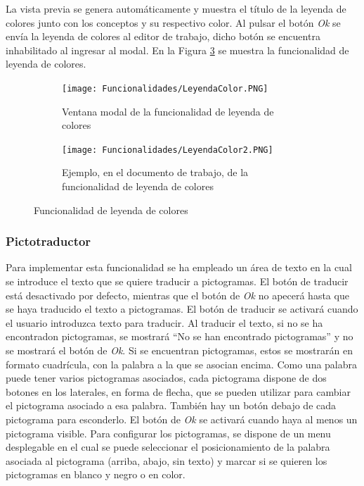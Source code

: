 La vista previa se genera automáticamente y muestra el título de la leyenda de colores junto con los conceptos y su respectivo color. Al pulsar el botón \textit{Ok} se envía la leyenda de colores al editor de trabajo, dicho botón se encuentra inhabilitado al ingresar al modal. En la Figura \ref{fig:leyendacolor} se muestra la funcionalidad de leyenda de colores.

\begin{figure}[ht!]
  \centering
  \begin{subfigure}{\textwidth}
    \centering
    \texttt{[image: Funcionalidades/LeyendaColor.PNG]}
    \caption{Ventana modal de la funcionalidad de leyenda de colores}
    \label{fig:leyendacolor01}
  \end{subfigure}

  \begin{subfigure}{\textwidth}
    \centering
    \texttt{[image: Funcionalidades/LeyendaColor2.PNG]}
    \caption{Ejemplo, en el documento de trabajo, de la funcionalidad de leyenda de colores}
    \label{fig:leyendacolor02}
  \end{subfigure}

  \caption{Funcionalidad de leyenda de colores}
  \label{fig:leyendacolor}
\end{figure}

\subsubsection{Pictotraductor}
\label{sec:imppictotraductor}
Para implementar esta funcionalidad se ha empleado un área de texto en la cual se introduce el texto que se quiere traducir a pictogramas. El botón de traducir está desactivado por defecto, mientras que el botón de \textit{Ok} no apecerá hasta que se haya traducido el texto a pictogramas. El botón de traducir se activará cuando el usuario introduzca texto para traducir. Al traducir el texto, si no se ha encontradon pictogramas, se mostrará ``No se han encontrado pictogramas'' y no se mostrará el botón de \textit{Ok}. Si se encuentran pictogramas, estos se mostrarán en formato cuadrícula, con la palabra a la que se asocian encima. Como una palabra puede tener varios pictogramas asociados, cada pictograma dispone de dos botones en los laterales, en forma de flecha, que se pueden utilizar para cambiar el pictograma asociado a esa palabra. También hay un botón debajo de cada pictograma para esconderlo. El botón de \textit{Ok} se activará cuando haya al menos un pictograma visible. Para configurar los pictogramas, se dispone de un menu desplegable en el cual se puede seleccionar el posicionamiento de la palabra asociada al pictograma (arriba, abajo, sin texto) y marcar si se quieren los pictogramas en blanco y negro o en color.

